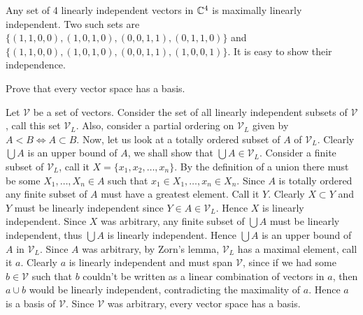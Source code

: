 \begin{solution}
  Any set of 4 linearly independent vectors in $\mathbb{C}^4$ is maximally linearly independent.
  Two such sets are $\{(1, 1, 0, 0), (1, 0, 1, 0), (0, 0, 1, 1), (0, 1, 1, 0)\}$ and $\{(1, 1, 0, 0), (1, 0, 1, 0), (0, 0, 1, 1), (1, 0, 0, 1)\}$.
  It is easy to show their independence.
\end{solution}

\begin{problem}
  Prove that every vector space has a basis.
\end{problem}

\begin{solution}
  Let $\mathcal{V}$ be a set of vectors.
  Consider the set of all linearly independent subsets of $\mathcal{V}$, call this set $\mathcal{V}_L$.
  Also, consider a partial ordering on $\mathcal{V}_L$ given by $A < B \Leftrightarrow A \subset B$.
  Now, let us look at a totally ordered subset of $A$ of $\mathcal{V}_L$.
  Clearly $\bigcup A$ is an upper bound of $A$, we shall show that $\bigcup A \in \mathcal{V}_L$.
  Consider a finite subset of $\mathcal{V}_L$, call it $X = \{x_1, x_2, \ldots, x_n\}$.
  By the definition of a union there must be some $X_1, \ldots, X_n \in A$ such that $x_1 \in X_1, \ldots, x_n \in X_n$.
  Since $A$ is totally ordered any finite subset of $A$ must have a greatest element.
  Call it $Y$.
  Clearly $X \subset Y$ and $Y$ must be linearly independent since $Y \in A \in \mathcal{V}_L$.
  Hence $X$ is linearly independent.
  Since $X$ was arbitrary, any finite subset of $\bigcup A$ must be linearly independent, thus $\bigcup A$ is linearly independent.
  Hence $\bigcup A$ is an upper bound of $A$ in $\mathcal{V}_L$.
  Since $A$ was arbitrary, by Zorn's lemma, $\mathcal{V}_L$ has a maximal element, call it $a$.
  Clearly $a$ is linearly independent and must span $\mathcal{V}$, since if we had some $b \in \mathcal{V}$ such that $b$ couldn't be written as a linear combination of vectors in $a$, then $a \cup b$ would be linearly independent, contradicting the maximality of $a$.
  Hence $a$ is a basis of $\mathcal{V}$.
  Since $\mathcal{V}$ was arbitrary, every vector space has a basis.
\end{solution}
